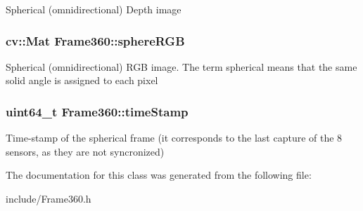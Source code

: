 Spherical (omnidirectional) Depth image \hypertarget{classFrame360_a38f90dc0b036cf29993025ad0642371f}{
\subsubsection[{sphere\-R\-G\-B}]{\setlength{\rightskip}{0pt plus 5cm}cv\-::\-Mat Frame360\-::sphere\-R\-G\-B}}\label{classFrame360_a38f90dc0b036cf29993025ad0642371f}
Spherical (omnidirectional) R\-G\-B image. The term spherical means that the same solid angle is assigned to each pixel \hypertarget{classFrame360_a65d8a8c0bfa17a0f766649dc8c0dc835}{
\subsubsection[{time\-Stamp}]{\setlength{\rightskip}{0pt plus 5cm}uint64\-\_\-t Frame360\-::time\-Stamp\hspace{0.3cm}{\ttfamily [private]}}}\label{classFrame360_a65d8a8c0bfa17a0f766649dc8c0dc835}
Time-\/stamp of the spherical frame (it corresponds to the last capture of the 8 sensors, as they are not syncronized) 

The documentation for this class was generated from the following file\-:\begin{DoxyCompactItemize}
\item 
include/Frame360.\-h\end{DoxyCompactItemize}
